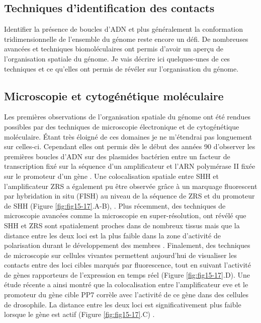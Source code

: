 \subsection{Techniques d’identification des contacts}
\label{subsec:contact-identification}

Identifier la présence de boucles d’ADN et plus généralement la conformation tridimensionnelle de l’ensemble du génome reste encore un défi. De nombreuses avancées et techniques biomoléculaires ont permis d’avoir un aperçu de l’organisation spatiale du génome. Je vais décrire ici quelques-unes de ces techniques et ce qu’elles ont permis de révéler sur l’organisation du génome.

\subsection{Microscopie et cytogénétique moléculaire}
\label{subsec:microscopie}

Les premières observations de l’organisation spatiale du génome ont été rendues possibles par des techniques de microscopie électronique et de cytogénétique moléculaire. Étant très éloigné de ces domaines je ne m'étendrai pas longuement sur celles-ci. Cependant elles ont permis dès le début des années 90 d’observer les premières boucles d’ADN sur des plasmides bactérien entre un facteur de transcription fixé sur la séquence d’un amplificateur et l’ARN polymérase II fixée sur le promoteur d’un gène \citep{su_dna-looping_1990}. Une colocalisation spatiale entre SHH et l’amplificateur ZRS a également pu être observée grâce à un marquage fluorescent par hybridation in situ (FISH) au niveau de la séquence de ZRS et du promoteur de SHH (Figure \ref{fig:fig15-17}.A-B), \citep{amano_chromosomal_2009}. Plus récemment, des techniques de microscopie avancées comme la microscopie en super-résolution, ont révélé que SHH et ZRS sont spatialement proches dans de nombreux tissus mais que la distance entre les deux loci est la plus faible dans la zone d’activité de polarisation durant le développement des membres \citep{williamson_shh_2016}. Finalement, des techniques de microscopie sur cellules vivantes permettent aujourd’hui de visualiser les contacts entre des loci cibles marqués par fluorescence, tout en suivant l’activité de gènes rapporteurs de l’expression en temps réel (Figure \ref{fig:fig15-17}.D). Une étude récente a ainsi montré que la colocalisation entre l’amplificateur eve et le promoteur du gène cible PP7 corrèle avec l’activité de ce gène dans des cellules de drosophile. La distance entre les deux loci est significativement plus faible lorsque le gène est actif (Figure \ref{fig:fig15-17}.C) \citep{chen_dynamic_2018}. \\

